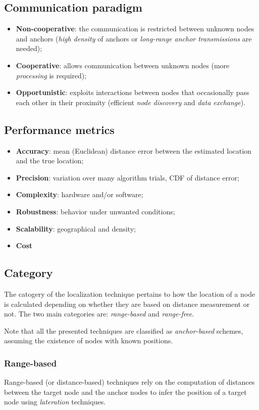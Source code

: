 \documentclass[a4paper,12pt]{article}
\begin{document}
\subsection{Communication paradigm}
\begin{itemize}
  \item \textbf{Non-cooperative}: the communication is restricted between unknown nodes and anchors (\textit{high density} of anchors or \textit{long-range anchor transmissions} are needed);
  \item \textbf{Cooperative}: allows communication between unknown nodes (more \textit{processing} is required);
  \item \textbf{Opportunistic}: exploits interactions between nodes that occasionally pass each other in their proximity (efficient \textit{node discovery} and \textit{data exchange}).
\end{itemize}

\subsection{Performance metrics}
\begin{itemize}
  \item \textbf{Accuracy}: mean (Euclidean) distance error between the estimated location and the true location;
  \item \textbf{Precision}: variation over many algorithm trials, CDF of distance error;
  \item \textbf{Complexity}: hardware and/or software;
  \item \textbf{Robustness}: behavior under unwanted conditions;
  \item \textbf{Scalability}: geographical and density;
  \item \textbf{Cost}
\end{itemize}

\subsection{Category}
The catogery of the localization technique pertains to how the location of a node is calculated depending on whether they are based on distance measurement or not. The two main categories are: \textit{range-based} and \textit{range-free}. 

Note that all the presented techniques are classified as \textit{anchor-based} schemes, assuming the existence of nodes with known positions.

\subsubsection{Range-based}
Range-based (or distance-based) techniques rely on the computation of distances between the target node and the anchor nodes to infer the position of a target node using \textit{lateration} techniques.
\end{document}
